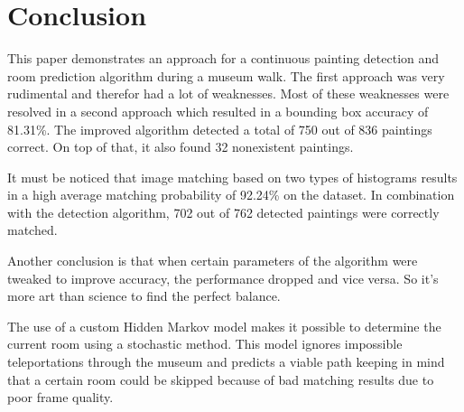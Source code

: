 \section{Conclusion}
\label{sec:conclusion}

This paper demonstrates an approach for a continuous painting detection and room prediction algorithm during a museum walk. The first approach was very rudimental and therefor had a lot of weaknesses. Most of these weaknesses were resolved in a second approach which resulted in a bounding box accuracy of 81.31\%. The improved algorithm detected a total of 750 out of 836 paintings correct. On top of that, it also found 32 nonexistent paintings.

It must be noticed that image matching based on two types of histograms results in a high average matching probability of 92.24\% on the dataset. In combination with the detection algorithm, 702 out of 762 detected paintings were correctly matched.

Another conclusion is that when certain parameters of the algorithm were tweaked to improve accuracy, the performance dropped and vice versa. So it's more art than science to find the perfect balance.

The use of a custom Hidden Markov model makes it possible to determine the current room using a stochastic method. This model ignores impossible teleportations through the museum and predicts a viable path keeping in mind that a certain room could be skipped because of bad matching results due to poor frame quality.

